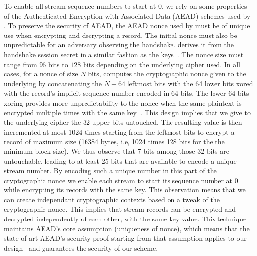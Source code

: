 To enable all stream sequence numbers to start at 0, we rely on some properties of the Authenticated Encryption with Associated Data (AEAD) schemes used
by . To preserve the security of AEAD, the AEAD nonce used by \tcpls
must be of unique use when encrypting and decrypting a record. The
initial nonce must also be unpredictable for an adversary observing the
handshake. \tcpls derives it from the \tls handshake session secret in
a similar fashion as the \tls keys~\cite{rfc8446}.
The nonce size must range from $96$ bits to $128$ bits depending on the
underlying cipher used. In all cases,
for a nonce of size $N$ bits, \tls computes the cryptographic nonce given to the underlying by concatenating the $N-64$ leftmost bits with the 64 lower
bits xored with the record's implicit sequence number encoded in 64 bits.
The lower 64 bits xoring provides more unpredictability to the nonce when
the same plaintext is encrypted multiple times with the same
key~\cite{bellare2016multi,hoang2018multi}. This design implies that we give to
the underlying cipher the 32 upper bits untouched. The resulting value is then
incremented at most 1024 times starting from the leftmost bits to encrypt a \tls
record of maximum size (16384 bytes, i.e, 1024 times 128 bits for the the
minimum block size). We thus observe that 7 bits among those 32 bits are
untouchable, leading to at least 25 bits that are available
to encode a unique stream number.
By encoding such a unique number in this part of the cryptographic nonce we enable each stream to start its sequence number at 0 while encrypting its records
with the same key. This observation means that we can create independant
cryptographic contexts based on a tweak of the cryptographic nonce. This implies that stream records can be encrypted and decrypted independently of each other, with the same key value.
This technique maintains AEAD's core assumption (uniqueness of nonce), which
means that the state of art AEAD's security proof starting from that assumption
applies to our design~\cite{chatterjee2011another} and guarantees the security
of our scheme.

